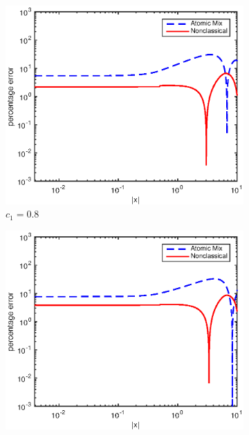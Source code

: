 \documentclass[12pt]{article}
\begin{document}
{\begin{figure}[p]
\begin{subfigure}{0.495\textwidth}
        \label{figerrF70}
    \end{subfigure}
    \\
    \centering
    \begin{subfigure}{0.495\textwidth}
        \centering
        \includegraphics[width=\textwidth]{NSE_err_F80.eps}
        \caption{$c_1 = 0.8$}
        \label{figerrF80}
    \end{subfigure}
    \hfill
    \begin{subfigure}{0.495\textwidth}
        \centering
        \includegraphics[width=\textwidth]{NSE_err_F90.eps}

\end{subfigure}
\end{figure}}
\end{document}
